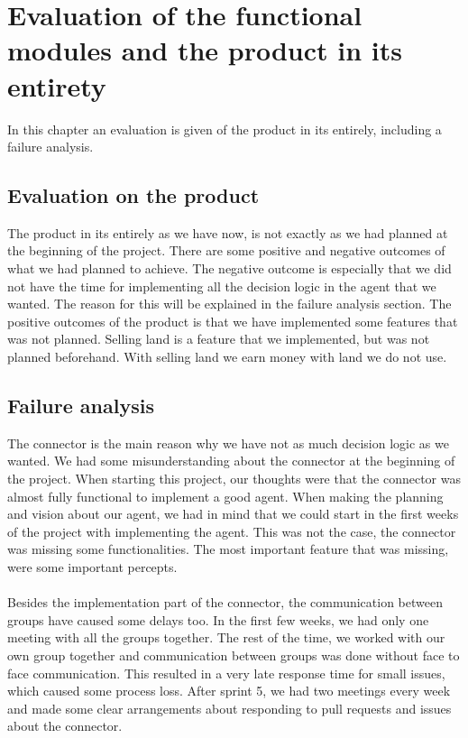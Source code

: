 \section{Evaluation of the functional modules and the product in its entirety}
In this chapter an evaluation is given of the product in its entirely, including a failure analysis. 

\subsection{Evaluation on the product}
The product in its entirely as we have now, is not exactly as we had planned at the beginning of the project. There are some positive and negative outcomes of what we had planned to achieve. The negative outcome is especially that we did not have the time for implementing all the decision logic in the agent that we wanted. The reason for this will be explained in the failure analysis section. The positive outcomes of the product is that we have implemented some features that was not planned. Selling land is a feature that we implemented, but was not planned beforehand. With selling land we earn money with land we do not use.  

\subsection{Failure analysis}
The connector is the main reason why we have not as much decision logic as we wanted. We had some misunderstanding about the connector at the beginning of the project. When starting this project, our thoughts were that the connector was almost fully functional to implement a good agent. When making the planning and vision about our agent, we had in mind that we could start in the first weeks of the project with implementing the agent.  This was not the case, the connector was missing some functionalities. The most important feature that was missing, were some important percepts. \\\\
Besides the implementation part of the connector, the communication between groups have caused some delays too. In the first few weeks, we had only one meeting with all the groups together. The rest of the time, we worked with our own group together and communication between groups was done without face to face communication. This resulted in a very late response time for small issues, which caused some process loss. After sprint 5, we had two meetings every week and made some clear arrangements about responding to pull requests and issues about the connector.
